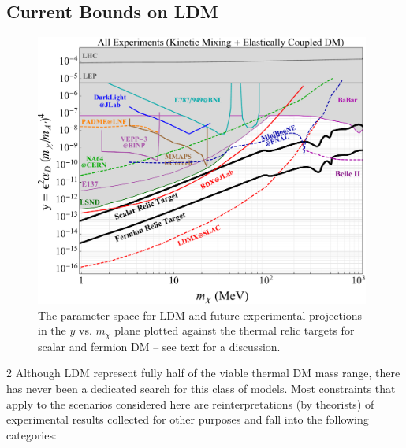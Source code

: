 \subsection{Current Bounds on LDM}


\begin{figure}[t!]
\center
\includegraphics[width=11cm]{sections/goals/everything.pdf}
\caption{ The parameter space for LDM and future experimental projections in the $y$ vs. $m_\chi$ plane plotted against
 the thermal relic targets for scalar and fermion DM -- see text for a discussion. }
\label{fig:mainplot}
\end{figure}

2
Although LDM represent fully half of the viable thermal DM mass range, there has never been a dedicated search
for this class of models. Most constraints that apply to the scenarios considered here are reinterpretations (by theorists)
of experimental results collected for other purposes and fall into the following categories:

